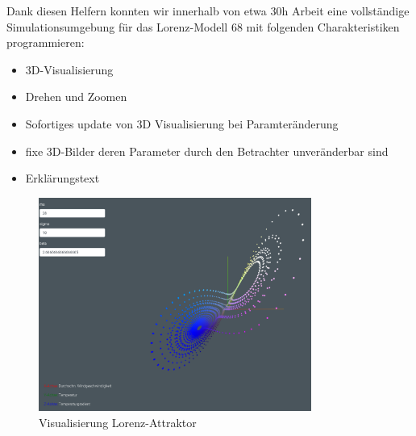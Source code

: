 Dank diesen Helfern konnten wir innerhalb von etwa 30h Arbeit eine vollständige Simulationsumgebung für das Lorenz-Modell 68 mit folgenden Charakteristiken programmieren:

\begin{itemize}
	\item 3D-Visualisierung
	\item Drehen und Zoomen
	\item Sofortiges update von 3D Visualisierung bei Paramteränderung
	\item fixe 3D-Bilder deren Parameter durch den Betrachter unveränderbar sind
	\item Erklärungstext
\end{itemize}

\begin{figure}
	\centering	\includegraphics[height=7cm]{lorenz/assets/implementation/Visualisierung}
	\caption{Visualisierung Lorenz-Attraktor}
	\label{fig:visualisierung}
\end{figure}
